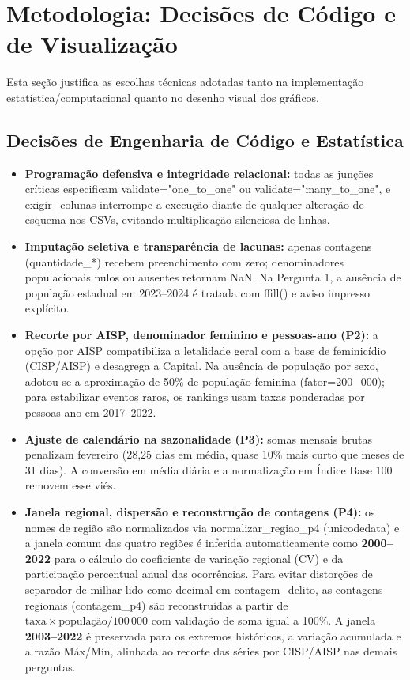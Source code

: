 \documentclass[11pt,a4paper]{article}
\newcommand{\code}[1]{{\ttfamily\footnotesize\allowbreak #1}}
\begin{document}
\section{Metodologia: Decisões de Código e de Visualização}

Esta seção justifica as escolhas técnicas adotadas tanto na implementação estatística/computacional quanto no desenho visual dos gráficos.

\subsection{Decisões de Engenharia de Código e Estatística}
\begin{itemize}
  \setlength{\itemsep}{3pt}\setlength{\parskip}{0pt}
  \item \textbf{Programação defensiva e integridade relacional:} todas as junções críticas especificam \code{validate="one\_to\_one"} ou \code{validate="many\_to\_one"}, e \code{exigir\_colunas} interrompe a execução diante de qualquer alteração de esquema nos CSVs, evitando multiplicação silenciosa de linhas.
  \item \textbf{Imputação seletiva e transparência de lacunas:} apenas contagens (\code{quantidade\_*}) recebem preenchimento com zero; denominadores populacionais nulos ou ausentes retornam \code{NaN}. Na Pergunta 1, a ausência de população estadual em 2023--2024 é tratada com \code{ffill()} e aviso impresso explícito.
  \item \textbf{Recorte por AISP, denominador feminino e pessoas-ano (P2):} a opção por AISP compatibiliza a letalidade geral com a base de feminicídio (CISP/AISP) e desagrega a Capital. Na ausência de população por sexo, adotou-se a aproximação de 50\% de população feminina (\code{fator=200\_000}); para estabilizar eventos raros, os rankings usam taxas ponderadas por pessoas-ano em 2017--2022.
  \item \textbf{Ajuste de calendário na sazonalidade (P3):} somas mensais brutas penalizam fevereiro (28,25 dias em média, quase 10\% mais curto que meses de 31 dias). A conversão em média diária e a normalização em Índice Base 100 removem esse viés.
  \item \textbf{Janela regional, dispersão e reconstrução de contagens (P4):} os nomes de região são normalizados via \code{normalizar\_regiao\_p4} (\code{unicodedata}) e a janela comum das quatro regiões é inferida automaticamente como \textbf{2000--2022} para o cálculo do coeficiente de variação regional (CV) e da participação percentual anual das ocorrências. Para evitar distorções de separador de milhar lido como decimal em \code{contagem\_delito}, as contagens regionais (\code{contagem\_p4}) são reconstruídas a partir de $\text{taxa} \times \text{população} / 100\,000$ com validação de soma igual a 100\%. A janela \textbf{2003--2022} é preservada para os extremos históricos, a variação acumulada e a razão Máx/Mín, alinhada ao recorte das séries por CISP/AISP nas demais perguntas.

\end{itemize}
\end{document}
